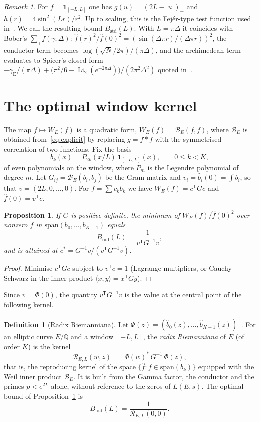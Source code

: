 \documentclass[11pt]{amsart}
\newtheorem{proposition}[theorem]{Proposition}
\theoremstyle{remark}
\newtheorem{remark}[theorem]{Remark}
\theoremstyle{definition}
\newtheorem{definition}[theorem]{Definition}
\newcommand{\Q}{\mathbb{Q}}
\begin{document}
\begin{remark}
For $f=\mathbf 1_{[-L,L]}$ one has $g(u)=(2L-|u|)_+$ and $h(r)=4\sin^2(Lr)/r^2$. Up to scaling, this is the Fej\'er-type test function used in~\cite{Bober,KSW}. We call the resulting bound $B_{\mathrm{std}}(L)$. With $L=\pi\Delta$ it coincides with Bober's $\sum_\gamma f(\gamma;\Delta)$: $\hat f(r)^2/\hat f(0)^2=(\sin(\Delta\pi r)/(\Delta\pi r))^2$, the conductor term becomes $\log(\sqrt N/2\pi)/(\pi\Delta)$, and the archimedean term evaluates to Spicer's closed form $-\gamma_{\mathrm E}/(\pi\Delta)+\big(\pi^2/6-\operatorname{Li}_2(e^{-2\pi\Delta})\big)/(2\pi^2\Delta^2)$ quoted in~\cite{KSW}.
\end{remark}

\section{The optimal window kernel}

The map $f\mapsto W_E(f)$ is a quadratic form, $W_E(f)=\mathcal B_E(f,f)$, where $\mathcal B_E$ is obtained from~\eqref{eq:explicit} by replacing $g=f*f$ with the symmetrised correlation of two functions. Fix the basis
\[
b_k(x)=P_{2k}(x/L)\,\mathbf 1_{[-L,L]}(x),\qquad 0\le k<K,
\]
of even polynomials on the window, where $P_m$ is the Legendre polynomial of degree $m$. Let $G_{ij}=\mathcal B_E(b_i,b_j)$ be the Gram matrix and $v_i=\hat b_i(0)=\int b_i$, so that $v=(2L,0,\dots,0)$. For $f=\sum c_k b_k$ we have $W_E(f)=c^{\mathsf T}Gc$ and $\hat f(0)=v^{\mathsf T}c$.

\begin{proposition}\label{prop:opt}
If $G$ is positive definite, the minimum of $W_E(f)/\hat f(0)^2$ over nonzero $f$ in $\mathrm{span}(b_0,\dots,b_{K-1})$ equals
\[
B_{\mathrm{rad}}(L)=\frac{1}{v^{\mathsf T}G^{-1}v},
\]
and is attained at $c^\ast=G^{-1}v/(v^{\mathsf T}G^{-1}v)$.
\end{proposition}
\begin{proof}
Minimise $c^{\mathsf T}Gc$ subject to $v^{\mathsf T}c=1$ (Lagrange multipliers, or Cauchy--Schwarz in the inner product $\langle x,y\rangle=x^{\mathsf T}Gy$).
\end{proof}

Since $v=\Phi(0)$, the quantity $v^{\mathsf T}G^{-1}v$ is the value at the central point of the following kernel.

\begin{definition}[Radix Riemanniana]\label{def:radix}
Let $\Phi(z)=(\hat b_0(z),\dots,\hat b_{K-1}(z))^{\mathsf T}$. For an elliptic curve $E/\Q$ and a window $[-L,L]$, the \emph{radix Riemanniana} of $E$ (of order $K$) is the kernel
\[
\mathcal R_{E,L}(w,z)\;=\;\Phi(w)^{\ast}\,G^{-1}\,\Phi(z),
\]
that is, the reproducing kernel of the space $\{\hat f: f\in\mathrm{span}(b_k)\}$ equipped with the Weil inner product $\mathcal B_E$. It is built from the Gamma factor, the conductor and the primes $p<e^{2L}$ alone, without reference to the zeros of $L(E,s)$. The optimal bound of Proposition~\ref{prop:opt} is
\[
B_{\mathrm{rad}}(L)=\frac{1}{\mathcal R_{E,L}(0,0)}.
\]
\end{definition}
\end{document}
